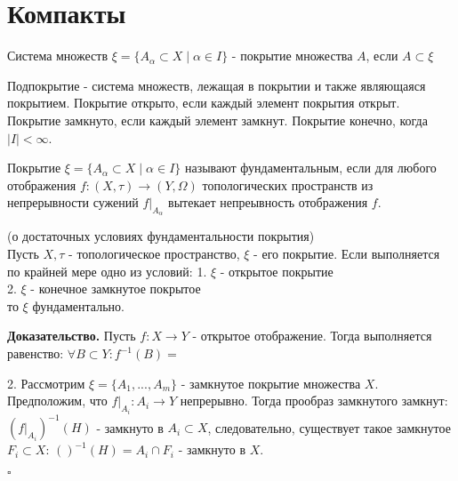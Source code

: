 \section{Компакты}
\begin{defin}
Система множеств $\xi=\{A_\alpha \subset X \mid \alpha\in I\}$ - покрытие
множества $A$, если  $A\subset \xi$
\end{defin}
Подпокрытие - система множеств, лежащая в покрытии и также являющаяся 
покрытием. 
Покрытие открыто, если каждый элемент покрытия открыт.
Покрытие замкнуто, если каждый элемент замкнут. 
Покрытие конечно, когда $|I|<\infty$. 
\begin{defin}
Покрытие $\xi=\{A_\alpha \subset X \mid \alpha\in I\}$ 
называют фундаментальным, если для любого отображения 
$f\colon  (X,\tau)\to (Y,\Omega)$
топологических пространств из непрерывности сужений $f|_{A_\alpha}$ 
вытекает непреывность отображения $f$.
\end{defin}
\begin{theor} (о достаточных условиях фундаментальности покрытия)\\
Пусть $X,\tau$ - топологическое пространство,  $\xi$ - его покрытие. 
Если выполняется по крайней мере одно из условий:
1. $\xi$ - открытое покрытие\\
2. $\xi$ - конечное замкнутое покрытое\\
то  $\xi$ фундаментально.
\end{theor}
\textbf{Доказательство.} Пусть $f\colon X\to Y$ - открытое отображение. 
Тогда выполняется равенство: 
$\forall B\subset Y:f^{-1}(B)=$



2. Рассмотрим $\xi=\{A_1,...,A_m\}$ - замкнутое покрытие множества $X$. 
Предположим, что $f|_{A_i}:A_i\to Y$ непрерывно. Тогда прообраз замкнутого
замкнут: $(f|_{A_i})^{-1}(H)$ - замкнуто в  $A_i\subset X$, следовательно,
существует такое замкнутое $F_i\subset X$: $()^{-1}(H)=A_i\cap F_i$ 
- замкнуто в $X$. 



$\square$ 
